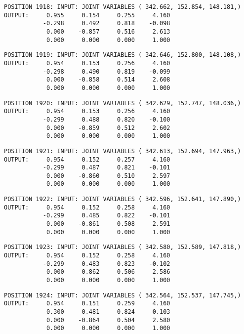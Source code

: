 \begin{verbatim}
POSITION 1918: INPUT: JOINT VARIABLES ( 342.662, 152.854, 148.181,)
OUTPUT:     0.955     0.154     0.255     4.160
           -0.298     0.492     0.818    -0.098
            0.000    -0.857     0.516     2.613
            0.000     0.000     0.000     1.000
\end{verbatim} \pagebreak[1]\begin{verbatim}
POSITION 1919: INPUT: JOINT VARIABLES ( 342.646, 152.800, 148.108,)
OUTPUT:     0.954     0.153     0.256     4.160
           -0.298     0.490     0.819    -0.099
            0.000    -0.858     0.514     2.608
            0.000     0.000     0.000     1.000
\end{verbatim} \pagebreak[1]\begin{verbatim}
POSITION 1920: INPUT: JOINT VARIABLES ( 342.629, 152.747, 148.036,)
OUTPUT:     0.954     0.153     0.256     4.160
           -0.299     0.488     0.820    -0.100
            0.000    -0.859     0.512     2.602
            0.000     0.000     0.000     1.000
\end{verbatim} \pagebreak[1]\begin{verbatim}
POSITION 1921: INPUT: JOINT VARIABLES ( 342.613, 152.694, 147.963,)
OUTPUT:     0.954     0.152     0.257     4.160
           -0.299     0.487     0.821    -0.101
            0.000    -0.860     0.510     2.597
            0.000     0.000     0.000     1.000
\end{verbatim} \pagebreak[1]\begin{verbatim}
POSITION 1922: INPUT: JOINT VARIABLES ( 342.596, 152.641, 147.890,)
OUTPUT:     0.954     0.152     0.258     4.160
           -0.299     0.485     0.822    -0.101
            0.000    -0.861     0.508     2.591
            0.000     0.000     0.000     1.000
\end{verbatim} \pagebreak[1]\begin{verbatim}
POSITION 1923: INPUT: JOINT VARIABLES ( 342.580, 152.589, 147.818,)
OUTPUT:     0.954     0.152     0.258     4.160
           -0.299     0.483     0.823    -0.102
            0.000    -0.862     0.506     2.586
            0.000     0.000     0.000     1.000
\end{verbatim} \pagebreak[1]\begin{verbatim}
POSITION 1924: INPUT: JOINT VARIABLES ( 342.564, 152.537, 147.745,)
OUTPUT:     0.954     0.151     0.259     4.160
           -0.300     0.481     0.824    -0.103
            0.000    -0.864     0.504     2.580
            0.000     0.000     0.000     1.000
\end{verbatim} \pagebreak[1]\begin{verbatim}

\end{verbatim}
